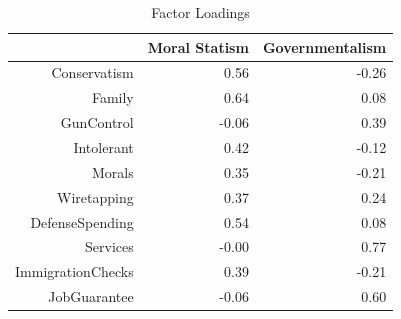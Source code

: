 \documentclass[12pt,]{article}
\begin{document}
\clearpage

\begin{table}[ht]
\centering
\begin{tabular}{rrr}
  \hline
 & Moral Statism & Governmentalism \\ 
  \hline
Conservatism & 0.56 & -0.26 \\ 
  Family & 0.64 & 0.08 \\ 
  GunControl & -0.06 & 0.39 \\ 
  Intolerant & 0.42 & -0.12 \\ 
  Morals & 0.35 & -0.21 \\ 
  Wiretapping & 0.37 & 0.24 \\ 
  DefenseSpending & 0.54 & 0.08 \\ 
  Services & -0.00 & 0.77 \\ 
  ImmigrationChecks & 0.39 & -0.21 \\ 
  JobGuarantee & -0.06 & 0.60 \\ 
   \hline
\end{tabular}
\caption{Factor Loadings} 
\label{Factor Loadings}
\end{table}

\clearpage
\end{document}
